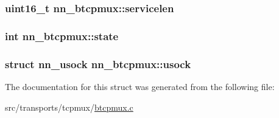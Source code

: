 \subsubsection[{servicelen}]{\setlength{\rightskip}{0pt plus 5cm}uint16\+\_\+t nn\+\_\+btcpmux\+::servicelen}\hypertarget{structnn__btcpmux_a6908f0b688e86cbab503cec8bae0afbd}{}\label{structnn__btcpmux_a6908f0b688e86cbab503cec8bae0afbd}
\subsubsection[{state}]{\setlength{\rightskip}{0pt plus 5cm}int nn\+\_\+btcpmux\+::state}\hypertarget{structnn__btcpmux_afc599be6405e8a1646274ab3a378ed87}{}\label{structnn__btcpmux_afc599be6405e8a1646274ab3a378ed87}
\subsubsection[{usock}]{\setlength{\rightskip}{0pt plus 5cm}struct {\bf nn\+\_\+usock} nn\+\_\+btcpmux\+::usock}\hypertarget{structnn__btcpmux_ab566e4fee610dd8580194d14a4ee2417}{}\label{structnn__btcpmux_ab566e4fee610dd8580194d14a4ee2417}


The documentation for this struct was generated from the following file\+:\begin{DoxyCompactItemize}
\item 
src/transports/tcpmux/\hyperlink{btcpmux_8c}{btcpmux.\+c}\end{DoxyCompactItemize}
